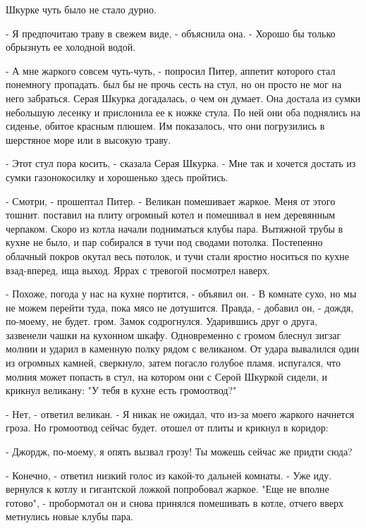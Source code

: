  Шкурке чуть было не стало дурно.
\par- Я предпочитаю траву в свежем виде, - объяснила она. - Хорошо бы 
только обрызнуть ее холодной водой.
\par- А мне жаркого совсем чуть-чуть, - попросил Питер, аппетит 
которого стал понемногу пропадать.
 был бы не прочь сесть на стул, но он просто не мог на него 
забраться. Серая Шкурка догадалась, о чем он думает. Она достала из 
сумки небольшую лесенку и прислонила ее к ножке стула. По ней они оба 
поднялись на сиденье, обитое красным плюшем. Им показалось, что они 
погрузились в шерстяное море или в высокую траву.
\par- Этот стул пора косить, - сказала Серая Шкурка. - Мне так и 
хочется достать из сумки газонокосилку и хорошенько здесь пройтись.
\par- Смотри, - прошептал Питер. - Великан помешивает жаркое. Меня от 
этого тошнит.
 поставил на плиту огромный котел и помешивал в нем 
деревянным черпаком. Скоро из котла начали подниматься клубы пара. 
Вытяжной трубы в кухне не было, и пар собирался в тучи под сводами 
потолка. Постепенно облачный покров окутал весь потолок, и тучи стали 
яростно носиться по кухне взад-вперед, ища выход.
 Яррах с тревогой посмотрел наверх.
\par- Похоже, погода у нас на кухне портится, - объявил он. - В 
комнате сухо, но мы не можем перейти туда, пока мясо не дотушится. 
Правда, - добавил он, - дождя, по-моему, не будет.
 гром. Замок содрогнулся. Ударившись друг о друга, зазвенели 
чашки на кухонном шкафу. Одновременно с громом блеснул зигзаг молнии и 
ударил в каменную полку рядом с великаном. От удара вывалился один из 
огромных камней, сверкнуло, затем погасло голубое пламя.
 испугался, что молния может попасть в стул, на котором они с 
Серой Шкуркой сидели, и крикнул великану: "У тебя в кухне есть 
громоотвод?"
\par- Нет, - ответил великан. - Я никак не ожидал, что из-за моего 
жаркого начнется гроза. Но громоотвод сейчас будет.
 отошел от плиты и крикнул в коридор:
\par- Джордж, по-моему, я опять вызвал грозу! Ты можешь сейчас же 
придти сюда?
\par- Конечно, - ответил низкий голос из какой-то дальней комнаты. - 
Уже иду.
 вернулся к котлу и гигантской ложкой попробовал жаркое. "Еще 
не вполне готово", - пробормотал он и снова принялся помешивать в 
котле, отчего вверх метнулись новые клубы пара.
